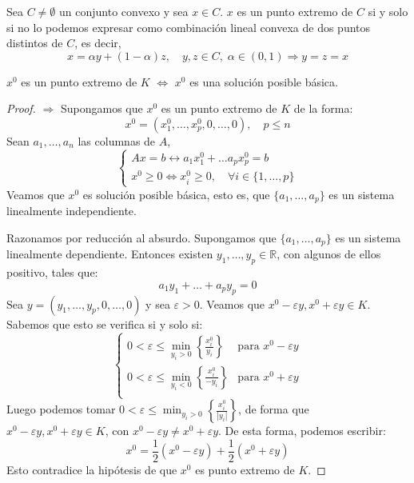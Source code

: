 \begin{definition}
    Sea $C \neq \emptyset$ un conjunto convexo y sea $x \in C$.
    $x$ es un punto extremo de $C$ si y solo si no lo podemos expresar como combinación lineal convexa de dos puntos distintos de $C$, es decir,
    $$x = \alpha y + (1-\alpha)z, \quad y, z \in C, \; \alpha \in (0, 1) \Rightarrow y = z = x$$
\end{definition}

\begin{theorem}
    $x^0$ es un punto extremo de $K$ $\Leftrightarrow$ $x^0$ es una solución posible básica.
\end{theorem}

\begin{proof}
    \hfill \break
    $\boxed{\Rightarrow}$ Supongamos que $x^0$ es un punto extremo de $K$ de la forma:
    $$x^0 = (x^0_1, \dots, x^0_p, 0, \dots, 0), \quad p \leq n$$
    Sean $a_1, \dots, a_n$ las columnas de $A$,
    $$\begin{cases}
            Ax = b \leftrightarrow a_1x^0_1 + \dots a_px^0_p = b \\
            x^0 \geq 0 \Leftrightarrow x^0_i \geq 0, \quad \forall i \in \{1, \dots, p\}
        \end{cases}$$
    Veamos que $x^0$ es solución posible básica, esto es, que $\{a_1, \dots, a_p\}$ es un sistema linealmente independiente.

    Razonamos por reducción al absurdo.
    Supongamos que $\{a_1, \dots, a_p\}$ es un sistema linealmente dependiente.
    Entonces existen $y_1, \dots, y_p \in \mathbb{R}$, con algunos de ellos positivo, tales que:
    $$a_1y_1 + \dots + a_py_p = 0$$
    Sea $y = (y_1, \dots, y_p, 0, \dots, 0)$ y sea $\varepsilon > 0$.
    Veamos que $x^0 - \varepsilon y, x^0 + \varepsilon y \in K$.
    Sabemos que esto se verifica si y solo si:
    $$\begin{cases}
            0 < \varepsilon \leq \min_{y_i > 0} \left\{\frac{x^0_i}{y_i}\right\}  & \text{para } x^0 - \varepsilon y \\
            0 < \varepsilon \leq \min_{y_i < 0} \left\{\frac{x^0_i}{-y_i}\right\} & \text{para } x^0 + \varepsilon y \\
        \end{cases}$$
    Luego podemos tomar $0 < \varepsilon \leq \min_{y_i > 0} \left\{\frac{x^0_i}{|y_i|}\right\}$, de forma que $x^0 - \varepsilon y, x^0 + \varepsilon y \in K$, con $x^0 - \varepsilon y \neq x^0 + \varepsilon y$.
    De esta forma, podemos escribir:
    $$x^0 = \frac{1}{2}(x^0 - \varepsilon y) + \frac{1}{2}(x^0 + \varepsilon y)$$
    Esto contradice la hipótesis de que $x^0$ es punto extremo de $K$.


\end{proof}
